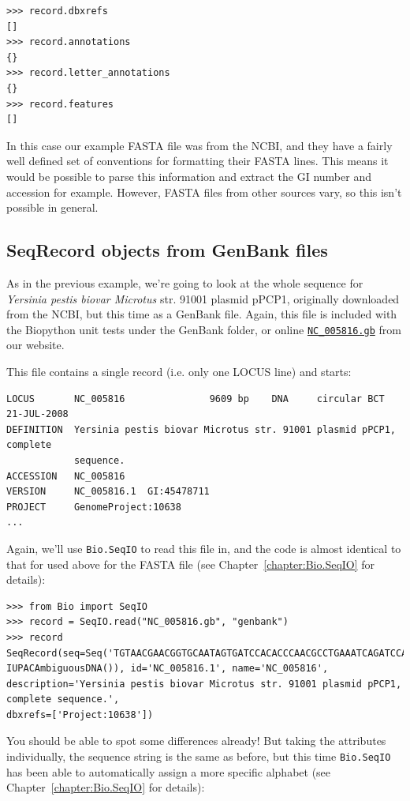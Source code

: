 \documentclass{report}
\begin{document}
\begin{verbatim}
>>> record.dbxrefs
[]
>>> record.annotations
{}
>>> record.letter_annotations
{}
>>> record.features
[]
\end{verbatim}

In this case our example FASTA file was from the NCBI, and they have a fairly well defined set of conventions for formatting their FASTA lines. This means it would be possible to parse this information and extract the GI number and accession for example. However, FASTA files from other sources vary, so this isn't possible in general.

\subsection{SeqRecord objects from GenBank files}

As in the previous example, we're going to look at the whole sequence for \textit{Yersinia pestis biovar Microtus} str. 91001 plasmid pPCP1, originally downloaded from the NCBI, but this time as a GenBank file.
Again, this file is included with the Biopython unit tests under the GenBank folder, or online \href{http://biopython.org/SRC/biopython/Tests/GenBank/NC_005816.gb}{\texttt{NC\_005816.gb}} from our website.

This file contains a single record (i.e. only one LOCUS line) and starts:
\begin{verbatim}
LOCUS       NC_005816               9609 bp    DNA     circular BCT 21-JUL-2008
DEFINITION  Yersinia pestis biovar Microtus str. 91001 plasmid pPCP1, complete
            sequence.
ACCESSION   NC_005816
VERSION     NC_005816.1  GI:45478711
PROJECT     GenomeProject:10638
...
\end{verbatim}

Again, we'll use \verb|Bio.SeqIO| to read this file in, and the code is almost identical to that for used above for the FASTA file (see Chapter~\ref{chapter:Bio.SeqIO} for details):

\begin{verbatim}
>>> from Bio import SeqIO
>>> record = SeqIO.read("NC_005816.gb", "genbank")
>>> record
SeqRecord(seq=Seq('TGTAACGAACGGTGCAATAGTGATCCACACCCAACGCCTGAAATCAGATCCAGG...CTG',
IUPACAmbiguousDNA()), id='NC_005816.1', name='NC_005816',
description='Yersinia pestis biovar Microtus str. 91001 plasmid pPCP1, complete sequence.',
dbxrefs=['Project:10638'])
\end{verbatim}

You should be able to spot some differences already! But taking the attributes individually,
the sequence string is the same as before, but this time \verb|Bio.SeqIO| has been able to automatically assign a more specific alphabet (see Chapter~\ref{chapter:Bio.SeqIO} for details):
\end{document}
